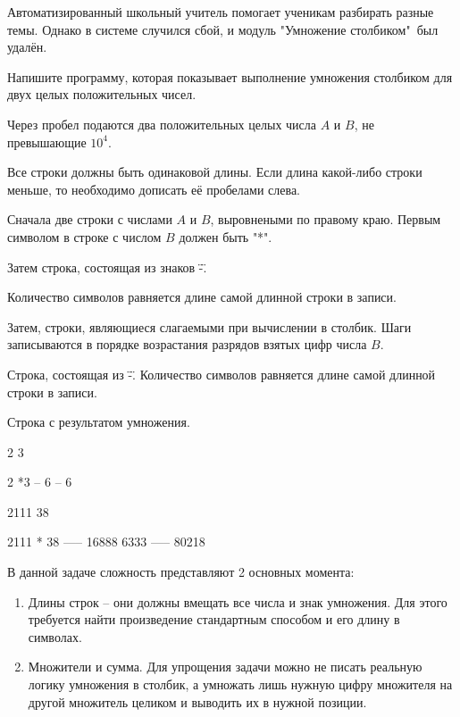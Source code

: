 
Автоматизированный школьный учитель помогает ученикам разбирать разные темы. Однако в системе случился сбой, и модуль "Умножение столбиком"\ был удалён.

Напишите программу, которая показывает выполнение умножения столбиком для двух целых положительных чисел.


Через пробел подаются два положительных целых числа $A$ и $B$, не превышающие $10^4$.

\outputfmtSection

Все строки должны быть одинаковой длины. Если длина какой-либо строки меньше, то необходимо дописать её пробелами слева.

Сначала две строки с числами $A$ и $B$, выровнеными по правому краю. Первым символом в строке с числом $B$ должен быть "*".

Затем строка, состоящая из знаков \"-\". 

Количество символов равняется длине самой длинной строки в записи.

Затем, строки, являющиеся слагаемыми при вычислении в столбик. Шаги записываются в порядке возрастания разрядов взятых цифр числа $B$.

Строка, состоящая из \"-\". Количество символов равняется длине самой длинной строки в записи.

Строка с результатом умножения.


\begin{myverbbox}[\small]{\vinput}
    2 3
\end{myverbbox}
\begin{myverbbox}[\small]{\voutput}
     2
    *3
    --
     6
    --
     6
\end{myverbbox}


\begin{myverbbox}[\small]{\vinput}
    2111 38
\end{myverbbox}
\begin{myverbbox}[\small]{\voutput}
     2111
    *  38
    -----
    16888
    6333 
    -----
    80218
\end{myverbbox}

\solutionSection

В данной задаче сложность представляют 2 основных момента:
\begin{enumerate}
    \item Длины строк – они должны вмещать все числа и знак умножения. Для этого требуется найти произведение стандартным способом и его длину в символах.
    \item Множители и сумма. Для упрощения задачи можно не писать реальную логику умножения в столбик, а умножать лишь нужную цифру множителя на другой множитель целиком и выводить их в нужной позиции.
\end{enumerate}


